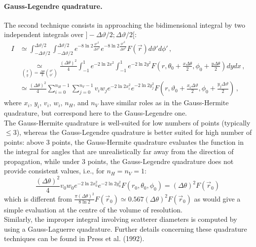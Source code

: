 \paragraph{Gauss-Legendre quadrature.} The second technique consists in approaching the bidimensional integral by two independent integrals over $]-\Delta\vartheta/2;\Delta\vartheta/2[$:
\begin{align}
I&\simeq\int_{-\Delta\vartheta/2}^{\Delta\vartheta/2}\int_{-\Delta\vartheta/2}^{\Delta\vartheta/2}e^{-8\ln2\frac{\vartheta'^2}{\Delta\vartheta^2}}e^{-8\ln2\frac{\phi'^2}{\Delta\vartheta^2}}F(\vec r)d\vartheta'd\phi'\,,\\
&\underset{\binom xy=\frac{\Delta\theta}2\binom{\vartheta'}{\phi'}}\simeq\frac{(\Delta\theta)^2}4\int_{-1}^1 e^{-2\ln2x^2}\int_{-1}^1 e^{-2\ln2y^2}F\left(r,\theta_0+\frac{x\Delta\theta}2,\phi_0+\frac{y\Delta\theta}2\right)d yd x\,,\\
&\simeq\frac{(\Delta\theta)^2}4\sum_{i=0}^{n_H-1}\sum_{j=0}^{n_V-1}v_iw_j e^{-2\ln2x_i^2}e^{-2\ln2y_j^2}F\left(r,\vartheta_0+\frac{x_i\Delta\vartheta}2,\phi_0+\frac{y_j\Delta\vartheta}2\right)\,,
\end{align}
where $x_i$, $y_i$, $v_i$, $w_i$, $n_H$, and $n_V$ have similar roles as in the Gauss-Hermite quadrature, but correspond here to the Gauss-Legendre one.\\


The Gauss-Hermite quadrature is well-suited for low numbers of points (typically $\le3$), whereas the Gauss-Legendre quadrature is better suited for high number of points: above 3 points, the Gauss-Hermite quadrature evaluates the function in the integral for angles that are unrealistically far away from the direction of propagation, while under 3 points, the Gauss-Legendre quadrature does not provide consistent values, i.e., for $n_H=n_V=1$:
\begin{equation}
\frac{(\Delta\theta)^2}4v_0w_0 e^{-2\ln2x_0^2}e^{-2\ln2y_0^2}F\left(r_0,\theta_0,\phi_0\right)=(\Delta\theta)^2F\left(\vec r_0\right)\,
\end{equation}
which is different from $\frac{\pi(\Delta\theta)^2}{8\ln2}F\left(\vec r_0\right)\simeq0.567(\Delta\theta)^2F\left(\vec r_0\right)$ as would give a simple evaluation at the centre of the volume of resolution.\\


Similarly, the improper integral involving scatterer diameters is computed by using a Gauss-Laguerre quadrature. Further details concerning these quadrature techniques can be found in Press et al. (1992). 


